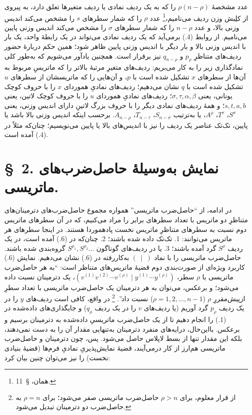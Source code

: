 \documentclass[11pt]{article}
\begin{document}
عدد مشخصهٔ $\rho(n-\rho)$ را که به یک ردیف نمادی یا ردیف متغیرها تعلق دارد، به پیروی از کلِبش وزن ردیف می‌نامیم،\footnote{همان، \S\ 11.} عدد $\rho$ را که شمار سطرهای $s$ را مشخص می‌کند اندیس وزنی بالا، و عدد $n-\rho$ را که شمار سطرهای $\sigma$ را مشخص می‌کند اندیس وزنی پایین می‌نامیم. از روابط (4.) برمی‌آید که یک ردیف نمادی می‌تواند در یک رابطهٔ واحد، یک بار با اندیس وزنی بالا و بار دیگر با اندیس وزنی پایین ظاهر شود؛ همین حکم دربارهٔ حضور ردیف‌های متناظرِ $p_\rho$ و $q_{n-\rho}$ نیز برقرار است. همچنین یادآور می‌شویم که به‌طور کلی نمادگذاری زیر را به کار می‌بریم: ردیف‌های متغیرِ مرتبهٔ بالاتر را که ماتریسِ مربوط به آن‌ها از سطرهای $x$ تشکیل شده است با $p$، و آن‌هایی را که ماتریسشان از سطرهای $u$ تشکیل شده است با $q$ نشان می‌دهیم؛ ردیف‌های نمادیِ هموردای $x$ را با حروف کوچک یونانی، یعنی $\sigma,\tau,\alpha,\beta$؛ ردیف‌های نمادیِ هموردای $u$ را با حروف کوچک لاتین، یعنی $s,t,a,b$؛ و همهٔ ردیف‌های نمادی دیگر را با حروف بزرگ لاتینِ دارای اندیس وزنی، یعنی $S^\sigma$، $T^\tau$، $A^\rho$، یا به‌ترتیب $S_{n-\sigma}$، $T_{n-\tau}$، $A_{n-\rho}$. برحسب اینکه اندیس وزنی بالا باشد یا پایین، تک‌تک عناصر یک ردیف را نیز با اندیس‌های بالا یا پایین می‌نویسیم؛ چنان‌که مثلاً در (4.) آمده است.

\section*{\S\ 2. نمایش به‌وسیلهٔ حاصل‌ضرب‌های ماتریسی.}
در ادامه، از ``حاصل‌ضرب ماتریسی'' همواره مجموع حاصل‌ضرب‌های دترمینان‌های متناظرِ دو ماتریس با تعداد سطرهای برابر را مراد می‌کنیم، که در آن سطرهای ماتریس دوم نسبت به سطرهای متناظرِ ماتریس نخست پادهموردا هستند. در اینجا سطرهای هر ماتریس می‌توانند: 1. تک‌تک داده شده باشند؛ 2. چنان‌که در (6.) آمده است، در یک ردیف $S^\rho$ گرد آمده باشند؛ 3. یا در ردیف‌های گوناگون $S^{\rho_1},S^{\rho_2}\ldots$ گروه‌بندی شده باشند. حاصل‌ضرب ماتریسی را با نماد $(\ \mid\ )$ به‌کاررفته در (6.) نشان می‌دهیم. نمایش (6.) کاربرد ویژه‌ای از صورت‌بندی دوم قضیهٔ ماتریس‌های متناظر است: ``به هر حاصل‌ضرب ماتریسی با $\rho$ سطر، $(v^{(1)}v^{(2)}\cdots v^{(\rho)}\mid y^{(1)}\cdots y^{(\rho)})$، یک دترمینان نسبت داده می‌شود؛ و برعکس، می‌توان به هر دترمینان یک حاصل‌ضرب ماتریسی با تعداد سطرِ ازپیش‌مقررِ $\rho$ ($\rho=1,2,\ldots,n-1$) نسبت داد''.
\footnote{از قرار معلوم، برای $\rho>n$ حاصل‌ضرب ماتریسی صفر می‌شود؛ برای $\rho=n$ به حاصل‌ضرب دو دترمینان تبدیل می‌شود.}
در واقع، کافی است ردیف‌های $y$ را در یک ردیف $p_\rho$ گرد آوریم (یا ردیف‌های $v$ را در یک ردیف $q_\rho$) و جایگذاری‌های داده‌شده در (1.) را انجام دهیم تا از یک حاصل‌ضرب ماتریسیِ داده‌شده به دترمینان برسیم و برعکس. بااین‌حال، درایه‌های منفرد دترمینان به‌تنهایی مقدار آن را به دست نمی‌دهند، بلکه این مقدار تنها از بسط لاپلاس حاصل می‌شود. پس، چون دترمینان و حاصل‌ضرب ماتریسی هم‌ارز از کار درمی‌آیند، قضیهٔ نمایش‌پذیریِ نمادیِ فرم‌ها (قضیهٔ بنیادی نخست) را نیز می‌توان چنین بیان کرد:
\end{document}
